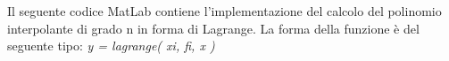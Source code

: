Il seguente codice MatLab contiene l'implementazione del calcolo del polinomio interpolante di grado n in forma di Lagrange. La forma della funzione è del seguente tipo: \textit{y = lagrange( xi, fi, x )}\\\
